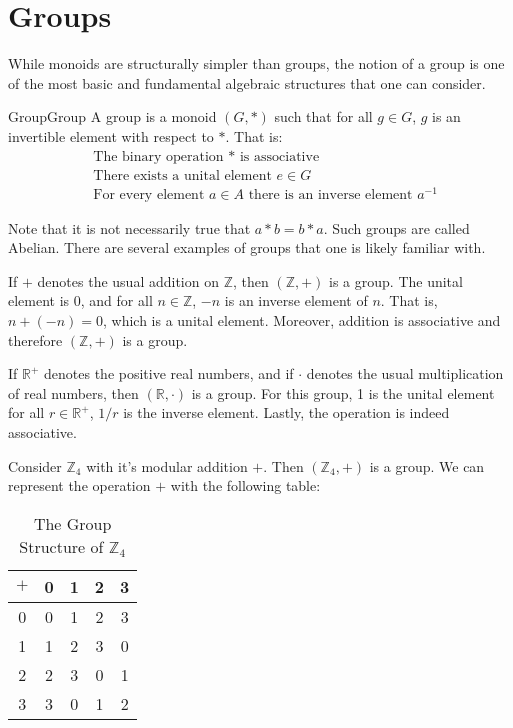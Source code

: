 \section{Groups}
    While monoids are structurally simpler than groups, the notion of a group
    is one of the most basic and fundamental algebraic structures that one can
    consider.
    \begin{fdefinition}{Group}{Group}
        A group is a \gls{monoid} $(G,*)$ such that for all $g\in{G}$, $g$ is
        an \gls{invertible element} with respect to $*$. That is:
        \begin{align}
            &\label{def:Group_Assoc}
            \textrm{The binary operation }*\textrm{ is associative}\tag{1}\\
            &\label{def:Group_Unit}
            \textrm{There exists a unital element $e\in{G}$}\tag{2}\\
            &\label{def:Group_Inverse}
            \textrm{For every element }a\in{A}
            \textrm{ there is an inverse element }a^{\minus{1}}\tag{3}
        \end{align}
    \end{fdefinition}
    Note that it is not necessarily true that $a*b=b*a$. Such groups are called
    Abelian. There are several examples of groups that one is likely familiar
    with.
    \begin{example}
        If $+$ denotes the usual addition on $\mathbb{Z}$, then
        $(\mathbb{Z},+)$ is a group. The unital element is 0, and for all
        $n\in\mathbb{Z}$, $\minus{n}$ is an inverse element of $n$. That is,
        $n+(\minus{n})=0$, which is a unital element. Moreover, addition is
        associative and therefore $(\mathbb{Z},+)$ is a group.
    \end{example}
    \begin{example}
        If $\mathbb{R}^{+}$ denotes the positive real numbers, and if $\cdot$
        denotes the usual multiplication of real numbers, then
        $(\mathbb{R},\cdot)$ is a group. For this group, 1 is the unital
        element for all $r\in\mathbb{R}^{+}$, $1/r$ is the inverse element.
        Lastly, the operation is indeed associative.
    \end{example}
    \begin{example}
        Consider $\mathbb{Z}_{4}$ with it's modular addition $+$. Then
        $(\mathbb{Z}_{4},+)$ is a group. We can represent the operation $+$ with
        the following table:
        \begin{table}[H]
            \centering
            \captionsetup{type=table}
            \begin{tabular}{c|cccc}
                $+$&0&1&2&3\\
                \hline
                0&0&1&2&3\\
                1&1&2&3&0\\
                2&2&3&0&1\\
                3&3&0&1&2
            \end{tabular}
            \caption{The Group Structure of $\mathbb{Z}_{4}$}
        \end{table}
    \end{example}
